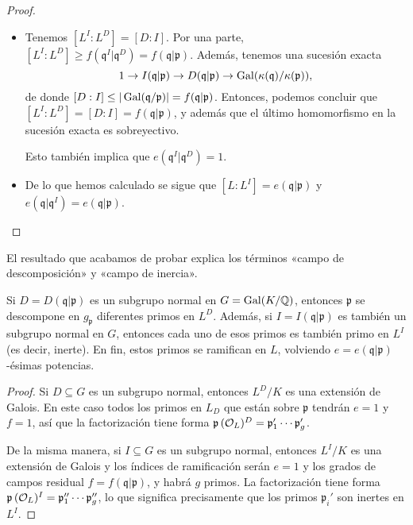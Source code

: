\begin{teorema}
\begin{proof}
\begin{itemize}
      \item Tenemos $[L^I : L^D] = [D : I]$. Por una parte,
        $[L^I : L^D] \ge f (\mathfrak{q}^I|\mathfrak{q}^D) = f (\mathfrak{q}|\mathfrak{p})$.
        Además, tenemos una sucesión exacta
        \[ 1 \to I (\mathfrak{q}|\mathfrak{p}) \to
        D (\mathfrak{q}|\mathfrak{p}) \to
        \operatorname{Gal} (\kappa(\mathfrak{q})/\kappa(\mathfrak{p})), \]
        de donde
        $[D : I] \le |\operatorname{Gal} (\mathfrak{q}/\mathfrak{p})| = f (\mathfrak{q}|\mathfrak{p})$.
        Entonces, podemos concluir que
        $[L^I : L^D] = [D : I] = f (\mathfrak{q}|\mathfrak{p})$, y además que
        el último homomorfismo en la sucesión exacta es sobreyectivo.

        Esto también implica que $e (\mathfrak{q}^I|\mathfrak{q}^D) = 1$.

      \item De lo que hemos calculado se sigue que
        $[L : L^I] = e (\mathfrak{q}|\mathfrak{p})$ y
        $e (\mathfrak{q}|\mathfrak{q}^I) = e (\mathfrak{q}|\mathfrak{p})$. \qedhere
    \end{itemize}
    \end{proof}
\end{teorema}

El resultado que acabamos de probar explica los términos
«campo de descomposición» y «campo de inercia».

\begin{corolario}
  Si $D = D (\mathfrak{q}|\mathfrak{p})$ es un subgrupo normal en
  $G = \operatorname{Gal} (K/\mathbb{Q})$, entonces $\mathfrak{p}$ se descompone en $g_\mathfrak{p}$
  diferentes primos en $L^D$. Además, si
  $I = I (\mathfrak{q}|\mathfrak{p})$ es también un subgrupo normal en $G$,
  entonces cada uno de esos primos es también primo en $L^I$ (es decir, inerte).
  En fin, estos primos se ramifican en $L$, volviendo
  $e = e (\mathfrak{q}|\mathfrak{p})$-ésimas potencias.

  \begin{proof}
    Si $D \subseteq G$ es un subgrupo normal, entonces $L^D/K$ es una extensión
    de Galois. En este caso todos los primos en $L_D$ que están sobre
    $\mathfrak{p}$ tendrán $e = 1$ y $f = 1$, así que la factorización tiene
    forma $\mathfrak{p}\,(\mathcal{O}_L)^D = \mathfrak{p}'_1\cdots\mathfrak{p}_g'$.

    De la misma manera, si $I \subseteq G$ es un subgrupo normal, entonces
    $L^I/K$ es una extensión de Galois y los índices de ramificación serán
    $e = 1$ y los grados de campos residual
    $f = f (\mathfrak{q}|\mathfrak{p})$, y habrá $g$ primos. La factorización
    tiene forma
    $\mathfrak{p}\,(\mathcal{O}_L)^I = \mathfrak{p}''_1\cdots\mathfrak{p}_g''$,
    lo que significa precisamente que los primos $\mathfrak{p}_i'$ son inertes
    en $L^I$.
  \end{proof}
\end{corolario}

